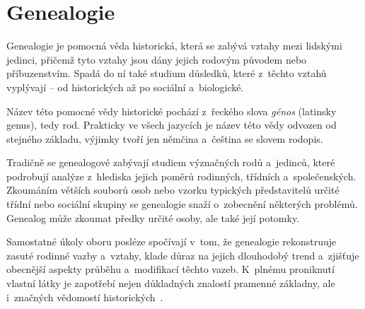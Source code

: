 
\chapter{Genealogie}
\label{chap:gene}
Genealogie je pomocná věda historická, která se zabývá vztahy mezi lidskými jedinci, přičemž tyto vztahy jsou dány jejich rodovým původem nebo příbuzenstvím. Spadá do ní také studium důsledků, které z~těchto vztahů vyplývají -- od historických až po sociální a~biologické. \par
Název této pomocné vědy historické pochází z~řeckého slova \emph{génos} (latinsky genus), tedy rod. Prakticky ve všech jazycích je název této vědy odvozen od stejného základu, výjimky tvoří jen němčina a~čeština se slovem rodopis. \par
Tradičně se genealogové zabývají studiem význačných rodů a~jedinců, které podrobují analýze z~hlediska jejich poměrů rodinných, třídních a~společenských. Zkoumáním větších souborů osob nebo vzorku typických představitelů určité třídní nebo sociální skupiny se genealogie snaží o~zobecnění některých problémů. Genealog může zkoumat předky určité osoby, ale také její potomky. \par
Samostatné úkoly oboru posléze spočívají v~tom, že genealogie rekonstruuje zasuté rodinné vazby a~vztahy, klade důraz na jejich dlouhodobý trend a~zjišťuje obecnější aspekty průběhu a~modifikací těchto vazeb. K~plnému proniknutí vlastní látky je zapotřebí nejen důkladných znalostí pramenné základny, ale i~značných vědomostí historických~\cite{bib:GeneVade}. \par

